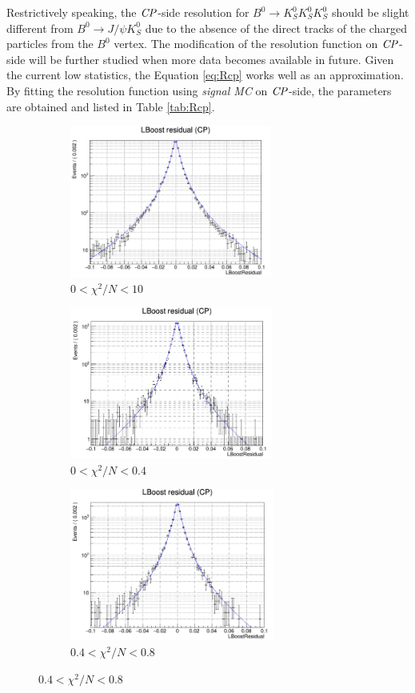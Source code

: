 Restrictively speaking, the $\it{CP}$-side resolution for $B^0 \to K_S^0  K_S^0  K_S^0$ should be slight different from $B^0\to J/\psi K_S^0$ due to the absence of the direct tracks of the charged particles from the $B^0$ vertex. The modification of the resolution function on $\it{CP}$-side will be further studied when more data becomes available in future. Given the current low statistics, the Equation \ref{eq:Rcp} works well as an approximation. By fitting the resolution function using \textit{signal MC} on $\it{CP}$-side, the parameters are obtained and listed in Table \ref{tab:Rcp}.
\begin{figure}[htbp]
	\begin{subfigure}{0.5\linewidth}
		\caption{$0<\chi^2/N<10$}
		\includegraphics[height=5cm]{figures/residual0_10}	
	\end{subfigure}
	\begin{subfigure}{0.5\linewidth}
		\caption{$0<\chi^2/N<0.4$}
		\includegraphics[height=5cm]{figures/residual0_0.4}
	\end{subfigure}
	\begin{subfigure}{0.5\linewidth}
		\caption{$0.4<\chi^2/N<0.8$}
		\includegraphics[height=5cm]{figures/residual0.4_0.8}

\end{subfigure}
\end{figure}

